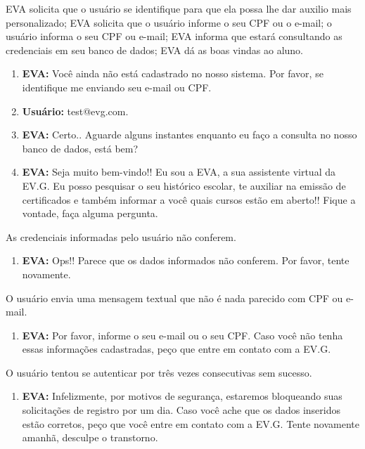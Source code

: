 EVA solicita que o usuário se identifique para que ela possa lhe dar auxilio mais personalizado; EVA solicita que o usuário informe o seu CPF ou o e-mail; o usuário informa o seu CPF ou e-mail; EVA informa que estará consultando as credenciais em seu banco de dados; EVA dá as boas vindas ao aluno.
        
\begin{enumerate}[label=\alph*)]
        \tightlist
    \item \textbf{EVA:} Você ainda não está cadastrado no nosso sistema. Por favor, se identifique me enviando seu e-mail ou CPF.
    \item \textbf{Usuário:} test@evg.com.
    \item \textbf{EVA:} Certo.. Aguarde alguns instantes enquanto eu faço a consulta no nosso banco de dados, está bem?
    \item \textbf{EVA:} Seja muito bem-vindo!! Eu sou a EVA, a sua assistente virtual da EV.G. Eu posso pesquisar o seu histórico escolar, te auxiliar na emissão de certificados e também informar a você quais cursos estão em aberto!! Fique a vontade, faça alguma pergunta.
\end{enumerate}
    
    
As credenciais informadas pelo usuário não conferem.
        
\begin{enumerate}[label=\alph*)]
        \tightlist
    \item \textbf{EVA:} Ops!! Parece que os dados informados não conferem. Por favor, tente novamente.
\end{enumerate}
        
O usuário envia uma mensagem textual que não é nada parecido com CPF ou e-mail.

\begin{enumerate}[label=\alph*)]
        \tightlist
    \item \textbf{EVA:} Por favor, informe o seu e-mail ou o seu CPF. Caso você não tenha essas informações cadastradas, peço que entre em contato com a EV.G.
\end{enumerate}
        
O usuário tentou se autenticar por três vezes consecutivas sem sucesso.

\begin{enumerate}[label=\alph*)]
        \tightlist
    \item \textbf{EVA:} Infelizmente, por motivos de segurança, estaremos bloqueando suas solicitações de registro por um dia. Caso você ache que os dados inseridos estão corretos, peço que você entre em contato com a EV.G. Tente novamente amanhã, desculpe o transtorno.
\end{enumerate}
        
